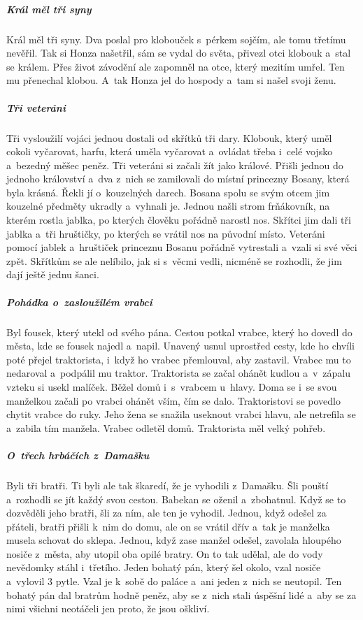 {{\subparagraph{Král měl tři syny}
	Král měl tři syny. Dva poslal pro klobouček s~pérkem sojčím, ale tomu třetímu
	nevěřil. Tak si Honza našetřil, sám se vydal do světa, přivezl otci klobouk
a~stal se králem. Přes život závodění ale zapomněl na otce, který mezitím umřel.
	Ten mu přenechal klobou. A~tak Honza jel do hospody a~tam si našel svoji ženu.

\subparagraph{Tři veteráni}
	Tři vysloužilí vojáci jednou dostali od skřítků tři dary. Klobouk, který uměl
	cokoli vyčarovat, harfu, která uměla vyčarovat a~ovládat třeba i~celé vojsko
a~bezedný měšec peněz. Tři veteráni si začali žít jako králové. Přišli jednou do
	jednoho království a~dva z~nich se zamilovali do místní princezny Bosany, která
	byla krásná. Řekli jí o~kouzelných darech. Bosana spolu se svým otcem jim
	kouzelné předměty ukradly a~vyhnali je. Jednou našli strom frňákovník, na
	kterém rostla jablka, po kterých člověku pořádně narostl nos. Skřítci jim dali
	tři jablka a~tři hruštičky, po kterých se vrátil nos na původní místo. Veteráni
	pomocí jablek a~hruštiček princeznu Bosanu pořádně vytrestali a~vzali si své
	věci zpět. Skřítkům se ale nelíbilo, jak si s~věcmi vedli, nicméně se rozhodli,
	že jim dají ještě jednu šanci.

\subparagraph{Pohádka o~zasloužilém vrabci}
	Byl fousek, který utekl od svého pána. Cestou potkal vrabce, který ho dovedl do
	města, kde se fousek najedl a~napil. Unavený usnul uprostřed cesty, kde ho
	chvíli poté přejel traktorista, i~když ho vrabec přemlouval, aby zastavil.
	Vrabec mu to nedaroval a~podpálil mu traktor. Traktorista se začal ohánět
	kudlou a~v~zápalu vzteku si usekl malíček. Běžel domů i~s~vrabcem u~hlavy. Doma
	se i~se svou  manželkou začali po vrabci ohánět vším, čím se
	dalo. Traktoristovi se povedlo chytit vrabce do ruky. Jeho žena se snažila
	useknout vrabci hlavu, ale netrefila se a~zabila tím manžela. Vrabec odletěl
	domů. Traktorista měl velký pohřeb.

\subparagraph{O~třech hrbáčích z~Damašku}
	Byli tři bratři. Ti byli ale tak škaredí, že je vyhodili z~Damašku. Šli pouští
	a~rozhodli se jít každý svou cestou. Babekan se oženil a~zbohatnul. Když se to
	dozvěděli jeho bratři, šli za ním, ale ten je vyhodil. Jednou, když odešel za
	přáteli, bratři přišli k~nim do domu, ale on se vrátil dřív a~tak je manželka
	musela schovat do sklepa. Jednou, když zase manžel odešel, zavolala hloupého
	nosiče z~města, aby utopil oba opilé bratry. On to tak udělal, ale do vody
	nevědomky stáhl i~třetího. Jeden bohatý pán, který šel okolo, vzal nosiče
a~vylovil 3 pytle. Vzal je k~sobě do paláce a~ani jeden z~nich se neutopil. Ten
	bohatý pán dal bratrům hodně peněz, aby se z~nich stali úspěšní lidé a~aby se
	za nimi všichni neotáčeli jen proto, že jsou oškliví.

}}
